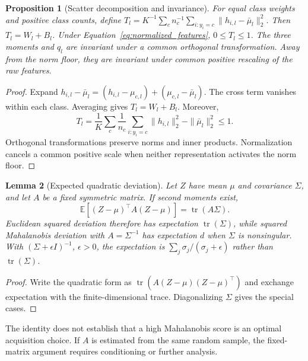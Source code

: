 \documentclass[a4paper,fleqn]{cas-dc}
\newtheorem{proposition}{Proposition}
\newtheorem{lemma}[proposition]{Lemma}
\newcommand{\E}{\mathbb{E}}
\newcommand{\tr}{\operatorname{tr}}
\begin{document}
\begin{proposition}[Scatter decomposition and invariance]
\label{prop:scatter}
For equal class weights and positive class counts, define
$T_l=K^{-1}\sum_c n_c^{-1}
\sum_{i:y_i=c}\|h_{i,l}-\bar\mu_l\|_2^2$.
Then $T_l=W_l+B_l$. Under
Equation~\eqref{eq:normalized_features}, $0\le T_l\le1$.
The three moments and $q_l$ are invariant under a common orthogonal
transformation. Away from the norm floor, they are invariant under
common positive rescaling of the raw features.
\end{proposition}
\begin{proof}
Expand
$h_{i,l}-\bar\mu_l=(h_{i,l}-\mu_{c,l})
+(\mu_{c,l}-\bar\mu_l)$.
The cross term vanishes within each class. Averaging gives
$T_l=W_l+B_l$. Moreover,
\[
 T_l=
 \frac1K\sum_c\frac1{n_c}\sum_{i:y_i=c}\|h_{i,l}\|_2^2
 -\|\bar\mu_l\|_2^2\le1.
\]
Orthogonal transformations preserve norms and inner products.
Normalization cancels a common positive scale when neither
representation activates the norm floor.
\end{proof}

\begin{lemma}[Expected quadratic deviation]
\label{lem:mahalanobis}
Let $Z$ have mean $\mu$ and covariance $\Sigma$, and let $A$ be
a fixed symmetric matrix. If second moments exist,
\begin{equation}
 \E[(Z-\mu)^\top A(Z-\mu)]=\tr(A\Sigma).
 \label{eq:quadratic_expectation}
\end{equation}
Euclidean squared deviation therefore has expectation
$\tr(\Sigma)$, while squared Mahalanobis deviation with
$A=\Sigma^{-1}$ has expectation $d$ when $\Sigma$ is nonsingular.
With $(\Sigma+\epsilon I)^{-1}$, $\epsilon>0$, the expectation
is $\sum_j\sigma_j/(\sigma_j+\epsilon)$ rather than $\tr(\Sigma)$.
\end{lemma}
\begin{proof}
Write the quadratic form as
$\tr(A(Z-\mu)(Z-\mu)^\top)$ and exchange expectation with the
finite-dimensional trace. Diagonalizing $\Sigma$ gives the
special cases.
\end{proof}
The identity does not establish that a high Mahalanobis score is an
optimal acquisition choice. If $A$ is estimated from the same random
sample, the fixed-matrix argument requires conditioning or further
analysis.
\end{document}
